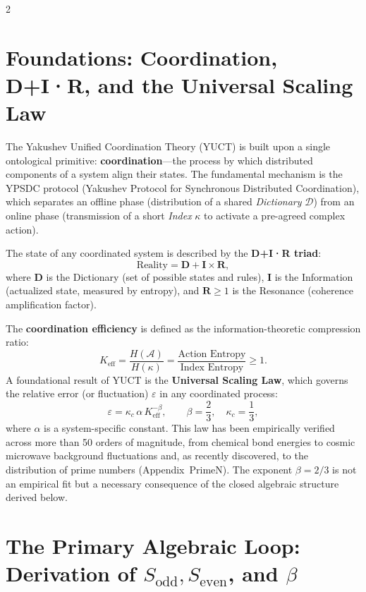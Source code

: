\documentclass[12pt,a4paper]{article}
\newcommand{\Keff}{K_{\mathrm{eff}}}
\newcommand{\kappac}{\kappa_c}
\begin{document}
	\vspace{0.4cm}
	
	\begin{multicols}{2}
		
		\section{Foundations: Coordination, D+I·R, and the Universal Scaling Law}
		
		The Yakushev Unified Coordination Theory (YUCT) is built upon a single ontological primitive: \textbf{coordination}—the process by which distributed components of a system align their states. The fundamental mechanism is the YPSDC protocol (Yakushev Protocol for Synchronous Distributed Coordination), which separates an offline phase (distribution of a shared \textit{Dictionary} \(\mathcal{D}\)) from an online phase (transmission of a short \textit{Index} \(\kappa\) to activate a pre-agreed complex action).
		
		The state of any coordinated system is described by the \textbf{D+I·R triad}:
		\[
		\text{Reality} = \mathbf{D} + \mathbf{I} \times \mathbf{R},
		\]
		where \(\mathbf{D}\) is the Dictionary (set of possible states and rules), \(\mathbf{I}\) is the Information (actualized state, measured by entropy), and \(\mathbf{R} \ge 1\) is the Resonance (coherence amplification factor).
		
		The \textbf{coordination efficiency} is defined as the information-theoretic compression ratio:
		\[
		\Keff = \frac{H(\mathcal{A})}{H(\kappa)} = \frac{\text{Action Entropy}}{\text{Index Entropy}} \ge 1.
		\]
		A foundational result of YUCT is the \textbf{Universal Scaling Law}, which governs the relative error (or fluctuation) \(\varepsilon\) in any coordinated process:
		\[
		\boxed{\varepsilon = \kappac \, \alpha \, \Keff^{-\beta}, \qquad \beta = \frac{2}{3}, \quad \kappac = \frac{1}{3}},
		\]
		where \(\alpha\) is a system-specific constant. This law has been empirically verified across more than 50 orders of magnitude, from chemical bond energies to cosmic microwave background fluctuations and, as recently discovered, to the distribution of prime numbers (Appendix~PrimeN). The exponent \(\beta = 2/3\) is not an empirical fit but a necessary consequence of the closed algebraic structure derived below.
		
		\section{The Primary Algebraic Loop: Derivation of \(S_{\mathrm{odd}}, S_{\mathrm{even}}\), and \(\beta\)}
		

\end{multicols}
\end{document}
